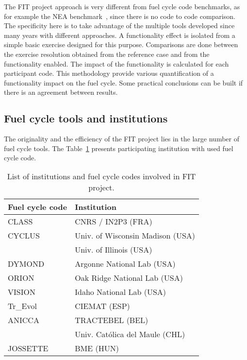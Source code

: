 The FIT project approach is very different from fuel cycle code benchmarks, as for example the NEA benchmark~\cite{NEA2016}, since there is no code to code comparison. The specificity here is to take advantage of the multiple tools developed since many years with different approaches. A functionality effect is isolated from a simple basic exercise designed for this purpose. Comparisons are done between the exercise resolution obtained from the reference case and from the functionality enabled. The impact of the functionality is calculated for each participant code. This methodology provide various quantification of a functionality impact on the fuel cycle. Some practical conclusions can be built if there is an agreement between results.

\subsection{Fuel cycle tools and institutions}

The originality and the efficiency of the FIT project lies in the large number of fuel cycle tools. The Table~\ref{Tab:Code} presents participating institution with used fuel cycle code.

\begin{table}[h]
\centering
\begin{tabular}{ |l|l| }
  \hline
  Fuel cycle code & Institution \\
  \hline
  CLASS\cite{} & CNRS / IN2P3 (FRA) \\
  \hline
  CYCLUS\cite{} & Univ. of Wisconsin Madison (USA) \\
  & Univ. of Illinois (USA) \\
  \hline
  DYMOND\cite{} & Argonne National Lab (USA) \\
  \hline
  ORION\cite{} & Oak Ridge National Lab (USA) \\
  \hline
  VISION\cite{} & Idaho National Lab (USA) \\
  \hline
  Tr\_Evol\cite{} & CIEMAT (ESP) \\
  \hline
  ANICCA\cite{} & TRACTEBEL (BEL) \\
   & Univ. Católica del Maule (CHL) \\
  \hline
  JOSSETTE\cite{} & BME (HUN) \\
  \hline
\end{tabular}
\label{Tab:Code}
\caption{List of institutions and fuel cycle codes involved in FIT project.}
\end{table}


